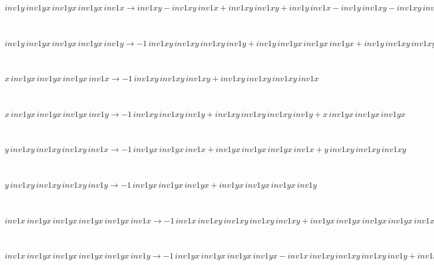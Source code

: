 \begin{minipage}{6in}
$
inv1y\,
 inv1yx\,
 inv1yx\,
 inv1yx\,
 inv1x\rightarrow inv1xy - inv1xy\,
 inv1x + inv1xy\,
 inv1xy + inv1y\,
 inv1x - inv1y\,
 inv1xy - inv1xy\,
 inv1xy\,
 inv1x + inv1xy\,
 inv1xy\,
 inv1xy + inv1y\,
 inv1xy\,
 inv1x - inv1y\,
 inv1xy\,
 inv1xy - inv1xy\,
 inv1xy\,
 inv1xy\,
 inv1x + inv1y\,
 inv1xy\,
 inv1xy\,
 inv1x - inv1y\,
 inv1xy\,
 inv1xy\,
 inv1xy + inv1y\,
 inv1xy\,
 inv1xy\,
 inv1xy\,
 inv1x
$
\end{minipage}\medskip \\
\begin{minipage}{6in}
$
inv1y\,
 inv1yx\,
 inv1yx\,
 inv1yx\,
 inv1y\rightarrow -1\,
 inv1xy\,
 inv1xy\,
 inv1xy\,
 inv1y + inv1y\,
 inv1yx\,
 inv1yx\,
 inv1yx + inv1y\,
 inv1xy\,
 inv1xy\,
 inv1xy\,
 inv1y
$
\end{minipage}\medskip \\
\begin{minipage}{6in}
$
x\,
 inv1yx\,
 inv1yx\,
 inv1yx\,
 inv1x\rightarrow -1\,
 inv1xy\,
 inv1xy\,
 inv1xy + inv1xy\,
 inv1xy\,
 inv1xy\,
 inv1x
$
\end{minipage}\medskip \\
\begin{minipage}{6in}
$
x\,
 inv1yx\,
 inv1yx\,
 inv1yx\,
 inv1y\rightarrow -1\,
 inv1xy\,
 inv1xy\,
 inv1y + inv1xy\,
 inv1xy\,
 inv1xy\,
 inv1y + x\,
 inv1yx\,
 inv1yx\,
 inv1yx
$
\end{minipage}\medskip \\
\begin{minipage}{6in}
$
y\,
 inv1xy\,
 inv1xy\,
 inv1xy\,
 inv1x\rightarrow -1\,
 inv1yx\,
 inv1yx\,
 inv1x + inv1yx\,
 inv1yx\,
 inv1yx\,
 inv1x + y\,
 inv1xy\,
 inv1xy\,
 inv1xy
$
\end{minipage}\medskip \\
\begin{minipage}{6in}
$
y\,
 inv1xy\,
 inv1xy\,
 inv1xy\,
 inv1y\rightarrow -1\,
 inv1yx\,
 inv1yx\,
 inv1yx + inv1yx\,
 inv1yx\,
 inv1yx\,
 inv1y
$
\end{minipage}\medskip \\
\begin{minipage}{6in}
$
inv1x\,
 inv1yx\,
 inv1yx\,
 inv1yx\,
 inv1yx\,
 inv1x\rightarrow -1\,
 inv1x\,
 inv1xy\,
 inv1xy\,
 inv1xy\,
 inv1xy + inv1yx\,
 inv1yx\,
 inv1yx\,
 inv1yx\,
 inv1x + inv1x\,
 inv1xy\,
 inv1xy\,
 inv1xy\,
 inv1xy\,
 inv1x
$
\end{minipage}\medskip \\
\begin{minipage}{6in}
$
inv1x\,
 inv1yx\,
 inv1yx\,
 inv1yx\,
 inv1yx\,
 inv1y\rightarrow -1\,
 inv1yx\,
 inv1yx\,
 inv1yx\,
 inv1yx - inv1x\,
 inv1xy\,
 inv1xy\,
 inv1xy\,
 inv1y + inv1x\,
 inv1yx\,
 inv1yx\,
 inv1yx\,
 inv1yx + inv1yx\,
 inv1yx\,
 inv1yx\,
 inv1yx\,
 inv1y + inv1x\,
 inv1xy\,
 inv1xy\,
 inv1xy\,
 inv1xy\,
 inv1y
$
\end{minipage}\medskip \\
